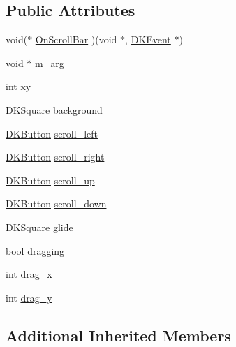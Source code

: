 \subsection*{Public Attributes}
\begin{DoxyCompactItemize}
\item 
void($\ast$ \hyperlink{class_d_k_scroll_bar_a3745939ebbb0453fbfd01d005ce949a4}{On\-Scroll\-Bar} )(void $\ast$, \hyperlink{class_d_k_event}{D\-K\-Event} $\ast$)
\item 
void $\ast$ \hyperlink{class_d_k_scroll_bar_a19e951b1f6fac9961a5b3d04441a2a90}{m\-\_\-arg}
\item 
int \hyperlink{class_d_k_scroll_bar_ae87dae10a6c4d78c98f8898cb58a7010}{xy}
\item 
\hyperlink{class_d_k_square}{D\-K\-Square} \hyperlink{class_d_k_scroll_bar_ad5f8342dde236d31ae18b721e369fea9}{background}
\item 
\hyperlink{class_d_k_button}{D\-K\-Button} \hyperlink{class_d_k_scroll_bar_a3942184400e1a2f34eae1a6a24e56823}{scroll\-\_\-left}
\item 
\hyperlink{class_d_k_button}{D\-K\-Button} \hyperlink{class_d_k_scroll_bar_a6ec476e55a0a3d7026067986403e85bf}{scroll\-\_\-right}
\item 
\hyperlink{class_d_k_button}{D\-K\-Button} \hyperlink{class_d_k_scroll_bar_a7022e7bc1eafa6f29375229fa93f6b07}{scroll\-\_\-up}
\item 
\hyperlink{class_d_k_button}{D\-K\-Button} \hyperlink{class_d_k_scroll_bar_adf1f3b3352b223b0bc149835c7feb6cf}{scroll\-\_\-down}
\item 
\hyperlink{class_d_k_square}{D\-K\-Square} \hyperlink{class_d_k_scroll_bar_aac22c304468601bddf50ccaae6d3d07a}{glide}
\item 
bool \hyperlink{class_d_k_scroll_bar_ada9b3fa01c8f5abee812d2735171f7a2}{dragging}
\item 
int \hyperlink{class_d_k_scroll_bar_abe218ec338a58d1d31abcd9d8e72dce4}{drag\-\_\-x}
\item 
int \hyperlink{class_d_k_scroll_bar_aea84ee1a7493f98e142cb0ddfd9997fe}{drag\-\_\-y}
\end{DoxyCompactItemize}
\subsection*{Additional Inherited Members}



